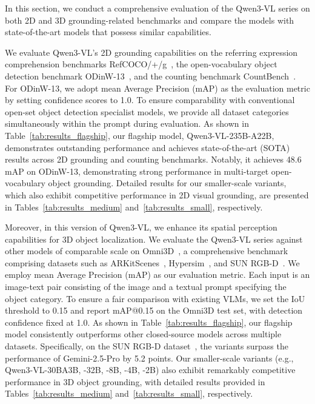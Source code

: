 In this section, we conduct a comprehensive evaluation of the Qwen3-VL series on both 2D and 3D grounding-related benchmarks and compare the models with state-of-the-art models that possess similar capabilities.

We evaluate Qwen3-VL's 2D grounding capabilities on the referring expression comprehension benchmarks RefCOCO/+/g~\citep{refcoco, refcocog}, the open-vocabulary object detection benchmark ODinW-13~\citep{li2022grounded}, and the counting benchmark CountBench~\citep{paiss2023teaching}. For ODinW-13, we adopt mean Average Precision (mAP) as the evaluation metric by setting confidence scores to 1.0. To ensure comparability with conventional open-set object detection specialist models, we provide all dataset categories simultaneously within the prompt during evaluation. As shown in Table~\ref{tab:results_flagship}, our flagship model, Qwen3-VL-235B-A22B, demonstrates outstanding performance and achieves state-of-the-art (SOTA) results across 2D grounding and counting benchmarks. Notably, it achieves 48.6 mAP on ODinW-13, demonstrating strong performance in multi-target open-vocabulary object grounding. Detailed results for our smaller-scale variants, which also exhibit competitive performance in 2D visual grounding, are presented in Tables~\ref{tab:results_medium} and~\ref{tab:results_small}, respectively.

Moreover, in this version of Qwen3-VL, we enhance its spatial perception capabilities for 3D object localization. We evaluate the Qwen3-VL series against other models of comparable scale on Omni3D~\citep{brazil2023omni3d}, a comprehensive benchmark comprising datasets such as ARKitScenes~\citep{baruch2021arkitscenes}, Hypersim~\citep{roberts2021hypersim}, and SUN RGB-D~\citep{song2015sun}. We employ mean Average Precision (mAP) as our evaluation metric. Each input is an image-text pair consisting of the image and a textual prompt specifying the object category. To ensure a fair comparison with existing VLMs, we set the IoU threshold to 0.15 and report mAP@0.15 on the Omni3D test set, with detection confidence fixed at 1.0. As shown in Table~\ref{tab:results_flagship}, our flagship \ModelBig model consistently outperforms other closed-source models across multiple datasets. Specifically, on the SUN RGB-D dataset~\citep{song2015sun}, the \ThinkBig variants surpass the performance of Gemini-2.5-Pro by 5.2 points. Our smaller-scale variants (e.g., Qwen3-VL-30BA3B, -32B, -8B, -4B, -2B) also exhibit remarkably competitive performance in 3D object grounding, with detailed results provided in Tables~\ref{tab:results_medium} and~\ref{tab:results_small}, respectively.